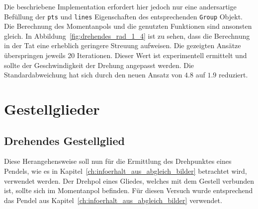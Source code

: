Die beschriebene Implementation erfordert hier jedoch nur eine andersartige Befüllung der \lstinline{pts} und \lstinline{lines} Eigenschaften des entsprechenden \lstinline{Group} Objekt.
Die Berechnung des Momentanpols und die genutzten Funktionen sind ansonsten gleich.
In Abbildung~\ref{fig:drehendes_rad_1_4} ist zu sehen, dass die Berechnung in der Tat eine erheblich geringere Streuung aufweisen.
Die gezeigten Ansätze überspringen jeweils 20 Iterationen.
Dieser Wert ist experimentell ermittelt und sollte der Geschwindigkeit der Drehung angepasst werden.
Die Standardabweichung hat sich durch den neuen Ansatz von $4.8$ auf $1.9$ reduziert.

\section{Gestellglieder}

\subsection{Drehendes Gestellglied}

Diese Herangehensweise soll nun für die Ermittlung des Drehpunktes eines Pendels, wie es in Kapitel~\ref{ch:infoerhalt_aus_abgleich_bilder} betrachtet wird, verwendet werden.
Der Drehpol eines Gliedes, welches mit dem Gestell verbunden ist, sollte sich im Momentanpol befinden.
Für diesen Versuch wurde entsprechend das Pendel aus Kapitel~\ref{ch:infoerhalt_aus_abgleich_bilder} verwendet.

